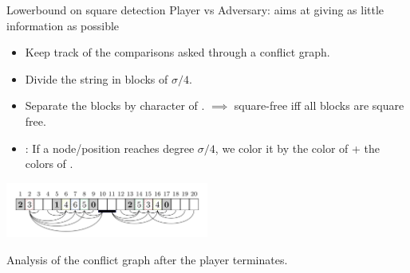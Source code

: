 \begin{frame}{Lowerbound on square detection}
    Player vs Adversary: aims at giving as little information as possible\\
    \begin{itemize}
        \item Keep track of the comparisons asked through a conflict graph.
        \item Divide the string in blocks of $\sigma/4$. 
        \item Separate the blocks by character of . $\implies$ square-free iff all blocks are square free.  
        \item {}: If a node/position reaches degree $\sigma/4$, we color it by  the color of  + the colors of .
    \end{itemize}
    
    \begin{center}
        \includegraphics[width=0.5\textwidth]{pictures/squares_conflict.png}
    \end{center}

    Analysis of the conflict graph after the player terminates.
\end{frame}
